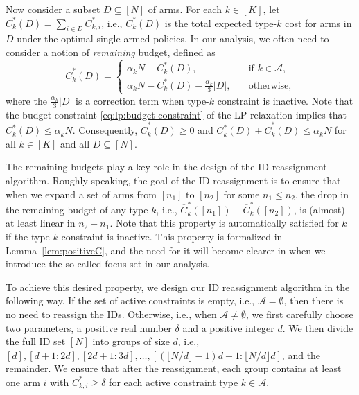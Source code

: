 \documentclass{article}
\theoremstyle{plain}
\theoremstyle{remark}
\newcommand{\rembud}{\overline{C}^*} %
\newcommand{\costIDreassign}{\delta} %
\newcommand{\gsizeIDreassign}{d} %
\newcommand{\cA}{\mathcal{A}}
\begin{document}
Now consider a subset $D\subseteq [N]$ of arms.
For each $k\in[K]$, let $C_k^*(D)=\sum_{i\in D}C_{k,i}^*$,
i.e., $C_k^*(D)$ is the total expected type-$k$ cost for arms in $D$ under the optimal single-armed policies.
In our analysis, we often need to consider a notion of \emph{remaining} budget, defined as
\begin{equation}\label{eq:remain-bud}
    \rembud_k(D)=
    \begin{cases}
        \alpha_k N-C_k^*(D),\quad&\text{if }k\in\cA,\\
        \alpha_k N-C_k^*(D)-\frac{\alpha_k}{3}|D|,\quad&\text{otherwise},
    \end{cases}
\end{equation}
where the $\frac{\alpha_k}{3}|D|$ is a correction term when type-$k$ constraint is inactive. 
Note that the budget constraint \eqref{eq:lp:budget-constraint} of the LP relaxation implies that $C_k^*(D) \leq \alpha_k N$. Consequently, $\rembud_k(D)\ge 0$ and $C_k^*(D)+\rembud_k(D)\le \alpha_k N$ for all $k\in[K]$ and all $D\subseteq [N]$.


The remaining budgets play a key role in the design of the ID reassignment algorithm.
Roughly speaking, the goal of the ID reassignment is to ensure that when we expand a set of arms from $[n_1]$ to $[n_2]$ for some $n_1\le n_2$, the drop in the remaining budget of any type $k$, i.e., $\rembud_k([n_1])-\rembud_k([n_2])$, is (almost) at least linear in $n_2-n_1$.
Note that this property is automatically satisfied for $k$ if the type-$k$ constraint is inactive.
This property is formalized in Lemma~\ref{lem:positiveC}, and the need for it will become clearer in  when we introduce the so-called focus set in our analysis. 


To achieve this desired property, we design our ID reassignment algorithm in the following way.
If the set of active constraints is empty, i.e., $\cA=\emptyset$, then there is no need to reassign the IDs. 
Otherwise, i.e., when $\cA\neq \emptyset$, we first carefully choose two parameters, a positive real number $\costIDreassign$ and a positive integer $\gsizeIDreassign$.
We then divide the full ID set $[N]$ into groups of size $\gsizeIDreassign$, i.e., $[\gsizeIDreassign],[\gsizeIDreassign+1:2\gsizeIDreassign],[2\gsizeIDreassign+1:3\gsizeIDreassign],\dots,[(\lfloor N/\gsizeIDreassign\rfloor-1)\gsizeIDreassign+1: \lfloor N/\gsizeIDreassign\rfloor \gsizeIDreassign]$, and the remainder.
We ensure that after the reassignment, each group contains at least one arm $i$ with $C_{k,i}^*\ge \costIDreassign$ for each active constraint type $k\in\cA$.
\end{document}
